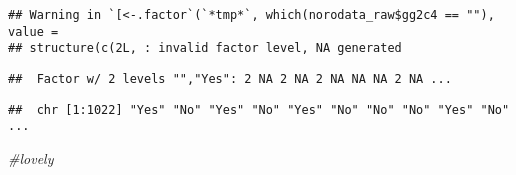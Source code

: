 \documentclass[]{article}
\newenvironment{Shaded}{\begin{snugshade}}{\end{snugshade}}
\newcommand{\CommentTok}[1]{\textcolor[rgb]{0.56,0.35,0.01}{\textit{#1}}}
\newcommand{\KeywordTok}[1]{\textcolor[rgb]{0.13,0.29,0.53}{\textbf{#1}}}
\newcommand{\NormalTok}[1]{#1}
\newcommand{\OperatorTok}[1]{\textcolor[rgb]{0.81,0.36,0.00}{\textbf{#1}}}
\newcommand{\StringTok}[1]{\textcolor[rgb]{0.31,0.60,0.02}{#1}}
\begin{document}
\begin{Shaded}
\end{Shaded}

\begin{verbatim}
## Warning in `[<-.factor`(`*tmp*`, which(norodata_raw$gg2c4 == ""), value =
## structure(c(2L, : invalid factor level, NA generated
\end{verbatim}

\begin{Shaded}
\end{Shaded}

\begin{verbatim}
##  Factor w/ 2 levels "","Yes": 2 NA 2 NA 2 NA NA NA 2 NA ...
\end{verbatim}

\begin{Shaded}
\end{Shaded}

\begin{verbatim}
##  chr [1:1022] "Yes" "No" "Yes" "No" "Yes" "No" "No" "No" "Yes" "No" ...
\end{verbatim}

\begin{Shaded}
\begin{Highlighting}[]
\CommentTok{#lovely}
\end{Highlighting}
\end{Shaded}
\end{document}
